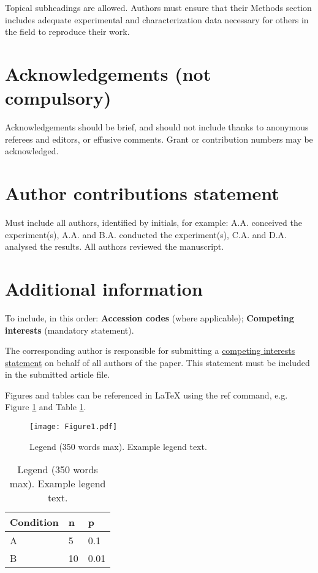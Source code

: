 \documentclass[fleqn,10pt,dvipsnames,colorlinks]{wlscirep}
\begin{document}
Topical subheadings are allowed. Authors must ensure that their Methods section includes adequate experimental and characterization data necessary for others in the field to reproduce their work.



\section*{Acknowledgements (not compulsory)}

Acknowledgements should be brief, and should not include thanks to anonymous referees and editors, or effusive comments. Grant or contribution numbers may be acknowledged.

\section*{Author contributions statement}

Must include all authors, identified by initials, for example:
A.A. conceived the experiment(s),  A.A. and B.A. conducted the experiment(s), C.A. and D.A. analysed the results.  All authors reviewed the manuscript. 

\section*{Additional information}

To include, in this order: \textbf{Accession codes} (where applicable); \textbf{Competing interests} (mandatory statement). 

The corresponding author is responsible for submitting a \href{http://www.nature.com/srep/policies/index.html#competing}{competing interests statement} on behalf of all authors of the paper. This statement must be included in the submitted article file.

Figures and tables can be referenced in LaTeX using the ref command, e.g. Figure \ref{fig:figure1} and Table \ref{tab:example}.

\begin{figure}[ht]
\centering
\texttt{[image: Figure1.pdf]}
\caption{Legend (350 words max). Example legend text.}
\label{fig:figure1}
\end{figure}

\begin{table}[ht]
\centering
\begin{tabular}{lll}
\hline
Condition & n & p \\
\hline
A & 5 & 0.1 \\
B & 10 & 0.01 \\
\hline
\end{tabular}
\caption{\label{tab:example}Legend (350 words max). Example legend text.}
\end{table}
\end{document}
